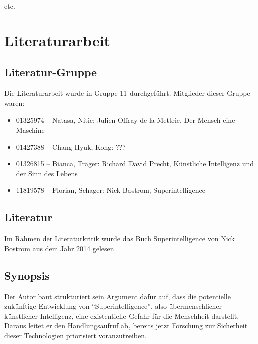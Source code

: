 \documentclass[twoside, a4paper, DIV=11, open=any, bibliography=totoc]{scrbook}
\begin{document}
etc.

\chapter{Literaturarbeit} \label{chp:LitKrit}

\section{Literatur-Gruppe} \label{sec:litgruppe}

Die Literaturarbeit wurde in Gruppe 11 durchgeführt. Mitglieder dieser Gruppe waren:

\begin{itemize}
    \item 01325974 – Natasa, Nitic: Julien Offray de la Mettrie, Der Mensch eine Maschine
    \item 01427388 – Chang Hyuk, Kong: ???
    \item 01326815 – Bianca, Träger: Richard David Precht, Künstliche Intelligenz und der Sinn des Lebens
    \item 11819578 – Florian, Schager: Nick Bostrom, Superintelligence
\end{itemize}


\section{Literatur} \label{sec:litlit}

Im Rahmen der Literaturkritik wurde das Buch Superintelligence von Nick Bostrom
aus dem Jahr 2014 gelesen.

\section{Synopsis} \label{sec:litsynops}

Der Autor baut strukturiert sein Argument dafür auf, dass die potentielle zukünftige
Entwicklung von \enquote{Superintelligence}, also übermenschlicher künstlicher Intelligenz,
eine existentielle Gefahr für die Menschheit darstellt. Daraus leitet er den
Handlungsaufruf ab, bereits jetzt Forschung zur Sicherheit dieser Technologien
priorisiert voranzutreiben.
\end{document}
